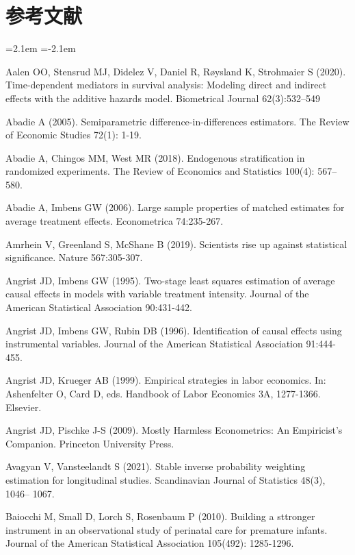 \chapter*{参考文献}
\thispagestyle{plain}
\begingroup\small\raggedright\setlength{\parindent}{0pt}
\begin{list}{}{\leftmargin=2.1em   \itemindent=-2.1em \parsep=0pt \itemsep=1.6pt \topsep=4pt \rightmargin=0pt}
\item Aalen OO, Stensrud MJ, Didelez V, Daniel R, Røysland K, Strohmaier S (2020). Time-dependent mediators in survival analysis: Modeling direct and indirect effects with the additive hazards model. Biometrical Journal 62(3):532–549
\item Abadie A (2005). Semiparametric difference-in-differences estimators. The Review of Economic Studies 72(1): 1-19.
\item Abadie A, Chingos MM, West MR (2018). Endogenous stratification in randomized experiments. The Review of Economics and Statistics 100(4): 567–580.
\item Abadie A, Imbens GW (2006). Large sample properties of matched estimates for average treatment effects. Econometrica 74:235-267.
\item Amrhein V, Greenland S, McShane B (2019). Scientists rise up against statistical significance. Nature 567:305-307.
\item Angrist JD, Imbens GW (1995). Two-stage least squares estimation of average causal effects in models with variable treatment intensity. Journal of the American Statistical Association 90:431-442.
\item Angrist JD, Imbens GW, Rubin DB (1996). Identification of causal effects using instrumental variables. Journal of the American Statistical Association 91:444-455.
\item Angrist JD, Krueger AB (1999). Empirical strategies in labor economics. In: Ashenfelter O, Card D, eds. Handbook of Labor Economics 3A, 1277-1366. Elsevier.
\item Angrist JD, Pischke J-S (2009). Mostly Harmless Econometrics: An Empiricist's Companion. Princeton University Press.
\item Avagyan V, Vansteelandt S (2021). Stable inverse probability weighting estimation for longitudinal studies. Scandinavian Journal of Statistics 48(3), 1046– 1067.
\item Baiocchi M, Small D, Lorch S, Rosenbaum P (2010). Building a sttronger instrument in an observational study of perinatal care for premature infants. Journal of the American Statistical Association 105(492): 1285-1296.

\end{list}
